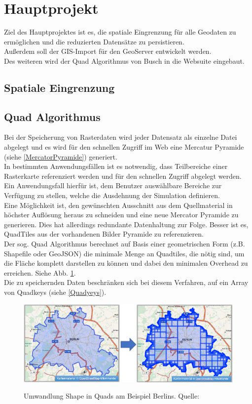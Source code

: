 \documentclass[10pt,conference,compsocconf]{IEEEtran}
\begin{document}
\section{Hauptprojekt}
Ziel des Hauptprojektes ist es, die spatiale Eingrenzung für alle Geodaten zu ermöglichen und die reduzierten Datensätze zu persistieren.\\
Außerdem soll der GIS-Import für den GeoServer entwickelt werden.\\
Des weiteren wird der Quad Algorithmus von Busch\cite{JanBusch} in die Websuite eingebaut.

\subsection{Spatiale Eingrenzung}

\subsection{Quad Algorithmus}
Bei der Speicherung von Rasterdaten wird jeder Datensatz als einzelne Datei abgelegt und es wird für den schnellen Zugriff im Web eine Mercatur Pyramide (siehe \ref{MercatorPyramide}) generiert.\\
In bestimmten Anwendungsfällen ist es notwendig, dass Teilbereiche einer Rasterkarte referenziert werden und für den schnellen Zugriff abgelegt werden. Ein Anwendungsfall hierfür ist, dem Benutzer auswählbare Bereiche zur Verfügung zu stellen, welche die Ausdehnung der Simulation definieren.\\
\indent Eine Möglichkeit ist, den gewünschten Ausschnitt aus dem Quellmaterial in höchster Auflösung heraus zu schneiden und eine neue Mercator Pyramide zu generieren. Dies hat allerdings redundante Datenhaltung zur Folge. Besser ist es, QuadTiles aus der vorhandenen Bilder Pyramide zu referenzieren.\\
Der sog. Quad Algorithmus\cite{JanBusch} berechnet auf Basis einer geometrischen Form (z.B. Shapefile oder GeoJSON) die minimale Menge an Quadtiles, die nötig sind, um die Fläche komplett darstellen zu können und dabei den minimalen Overhead zu erreichen. Siehe Abb. \ref{img:shape2quads}.\\
Die zu speichernden Daten beschränken sich bei diesem Verfahren, auf ein Array von Quadkeys (siehe \ref{Quadyeys}).

\begin{figure}[H]
	\centering
	\includegraphics[width=1\columnwidth]{img/shape2quads.png} \\
	\caption[]{Umwandlung Shape in Quads am Beispiel Berlins. Quelle: \cite{JanBusch}}
	\label{img:shape2quads}
\end{figure}
\end{document}
